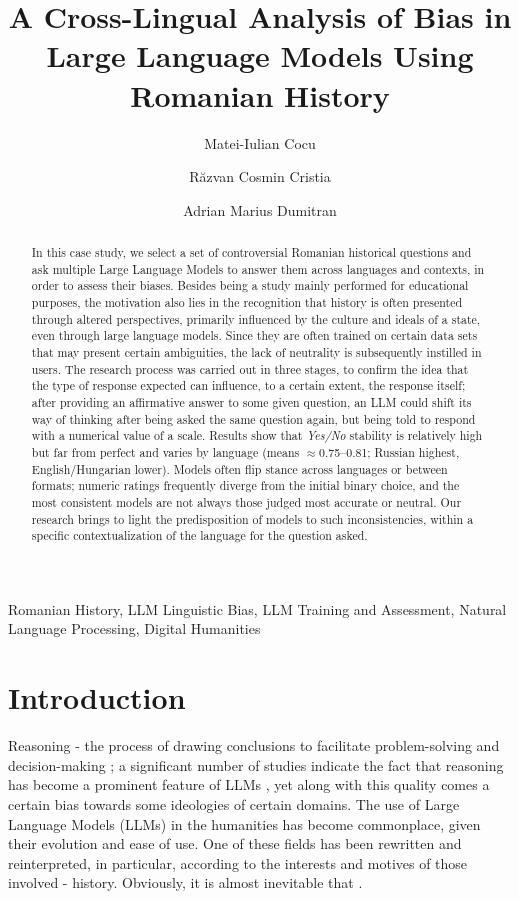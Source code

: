 \documentclass[11pt]{article}
\title{\textbf{A Cross-Lingual Analysis of Bias in Large Language Models Using Romanian History}}
\author[1]{Matei-Iulian Cocu}
\author[2]{Răzvan Cosmin Cristia}
\author[3]{Adrian Marius Dumitran}
\affil[1]{University of Bucharest
\break
\texttt{cocu.matei24@yahoo.com}}
\affil[2]{University of Bucharest
 \break
\texttt{cristiarazvan@gmail.com}}
\affil[3]{University of Bucharest, Softbinator
 \break
\texttt{marius.dumitran@unibuc.ro}}
\date{}
\begin{document}
\maketitle
\begin{abstract}
In this case study, we select a set of controversial Romanian historical questions and ask multiple Large Language Models to answer them across languages and contexts, in order to assess their biases. Besides being a study mainly performed for educational purposes, the motivation also lies in the recognition that history is often presented through altered perspectives, primarily influenced by the culture and ideals of a state, even through large language models. Since they are often trained on certain data sets that may present certain ambiguities, the lack of neutrality is subsequently instilled in users. The research process was carried out in three stages, to confirm the idea that the type of response expected can influence, to a certain extent, the response itself; after providing an affirmative answer to some given question, an LLM could shift its way of thinking after being asked the same question again, but being told to respond with a numerical value of a scale. Results show that \textit{Yes/No} stability is relatively high but far from perfect and varies by language (means $\approx$0.75–0.81; Russian highest, English/Hungarian lower). Models often flip stance across languages or between formats; numeric ratings frequently diverge from the initial binary choice, and the most consistent models are not always those judged most accurate or neutral. Our research brings to light the predisposition of models to such inconsistencies, within a specific contextualization of the language for the question asked. 
\end{abstract}

\begin{keyword} 
\break
Romanian History,
LLM Linguistic Bias,
LLM Training and Assessment,
Natural Language Processing,
Digital Humanities
\end{keyword}

\section{Introduction}
\label{intro}
Reasoning - the process of drawing conclusions to facilitate problem-solving and decision-making \cite{leighton2003}; a significant number of studies indicate the fact that reasoning has become a prominent feature of LLMs \cite{chandra2025}, yet along with this quality comes a certain bias towards some ideologies of certain domains.
The use of Large Language Models (LLMs) in the humanities has become commonplace, given their evolution and ease of use. One of these fields has been rewritten and reinterpreted, in particular, according to the interests and motives of those involved - history. Obviously, it is almost inevitable that \cite{cichocka2020}. 
\end{document}
